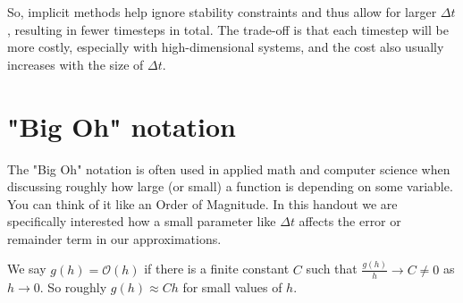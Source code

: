 \documentclass{article}
\newcommand{\dt}{\Delta t}
\newcommand{\bigO}{\mathcal{O}}
\begin{document}
So, implicit methods help ignore stability constraints
and thus allow for larger $\dt$, resulting in fewer timesteps 
in total. The trade-off is that each timestep will be more costly,
especially with high-dimensional systems,
and the cost also usually increases with the size of $\dt$.








\appendix

\section{"Big Oh" notation}
\label{a:bigO}

The "Big Oh" notation is often used in
applied math and computer science
when discussing roughly how large (or small) a function is depending on some variable.
You can think of it like an Order of Magnitude.
In this handout we are specifically interested how a small parameter like $\dt$
affects the error or remainder term in our approximations.

We say $g(h)=\bigO(h)$ if there is a finite constant $C$ such that
$\frac{g(h)}{h} \rightarrow C \neq 0$ 
as $h \rightarrow 0$.
So roughly $g(h) \approx C h$ for small values of $h$.
\end{document}
